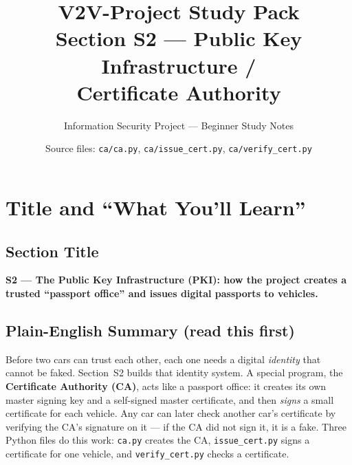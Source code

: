 \documentclass[11pt,a4paper]{article}
\title{\textbf{V2V-Project Study Pack}\\[4pt]
       \large Section S2 --- Public Key Infrastructure /\\ Certificate Authority}
\author{Information Security Project --- Beginner Study Notes}
\date{Source files: \texttt{ca/ca.py}, \texttt{ca/issue\_cert.py}, \texttt{ca/verify\_cert.py}}
\begin{document}
\maketitle
\tableofcontents
\newpage

\section{Title and ``What You'll Learn''}

\subsection*{Section Title}
\textbf{S2 --- The Public Key Infrastructure (PKI): how the project creates a
trusted ``passport office'' and issues digital passports to vehicles.}

\subsection*{Plain-English Summary (read this first)}
Before two cars can trust each other, each one needs a digital \emph{identity}
that cannot be faked. Section~S2 builds that identity system. A special program,
the \textbf{Certificate Authority (CA)}, acts like a passport office: it creates
its own master signing key and a self-signed master certificate, and then
\emph{signs} a small certificate for each vehicle. Any car can later check
another car's certificate by verifying the CA's signature on it --- if the CA
did not sign it, it is a fake. Three Python files do this work: \texttt{ca.py}
creates the CA, \texttt{issue\_cert.py} signs a certificate for one vehicle, and
\texttt{verify\_cert.py} checks a certificate.
\end{document}
